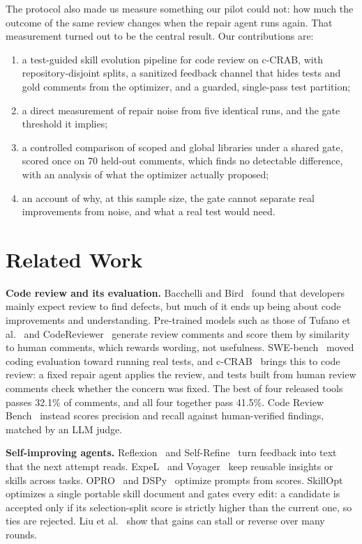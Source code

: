 \documentclass[sigconf, authorversion, nonacm]{acmart}
\begin{document}
The protocol also made us measure something our pilot could not: how much the outcome of the same review changes when the repair agent runs again. That measurement turned out to be the central result. Our contributions are:
\begin{enumerate}
\item a test-guided skill evolution pipeline for code review on c-CRAB, with repository-disjoint splits, a sanitized feedback channel that hides tests and gold comments from the optimizer, and a guarded, single-pass test partition;
\item a direct measurement of repair noise from five identical runs, and the gate threshold it implies;
\item a controlled comparison of scoped and global libraries under a shared gate, scored once on 70 held-out comments, which finds no detectable difference, with an analysis of what the optimizer actually proposed;
\item an account of why, at this sample size, the gate cannot separate real improvements from noise, and what a real test would need.
\end{enumerate}

\section{Related Work}
\textbf{Code review and its evaluation.} Bacchelli and Bird~\cite{bacchelli2013} found that developers mainly expect review to find defects, but much of it ends up being about code improvements and understanding. Pre-trained models such as those of Tufano et al.~\cite{tufano2022pretrained} and CodeReviewer~\cite{li2022codereviewer} generate review comments and score them by similarity to human comments, which rewards wording, not usefulness. SWE-bench~\cite{jimenez2024swebench} moved coding evaluation toward running real tests, and c-CRAB~\cite{zhang2026ccrab} brings this to code review: a fixed repair agent applies the review, and tests built from human review comments check whether the concern was fixed. The best of four released tools passes 32.1\% of comments, and all four together pass 41.5\%. Code Review Bench~\cite{zverianskii2026crb} instead scores precision and recall against human-verified findings, matched by an LLM judge.

\textbf{Self-improving agents.} Reflexion~\cite{shinn2023reflexion} and Self-Refine~\cite{madaan2023selfrefine} turn feedback into text that the next attempt reads. ExpeL~\cite{zhao2024expel} and Voyager~\cite{wang2023voyager} keep reusable insights or skills across tasks. OPRO~\cite{yang2024opro} and DSPy~\cite{khattab2024dspy} optimize prompts from scores. SkillOpt~\cite{yang2026skillopt} optimizes a single portable skill document and gates every edit: a candidate is accepted only if its selection-split score is strictly higher than the current one, so ties are rejected. Liu et al.~\cite{liu2026dynamics} show that gains can stall or reverse over many rounds.
\end{document}
